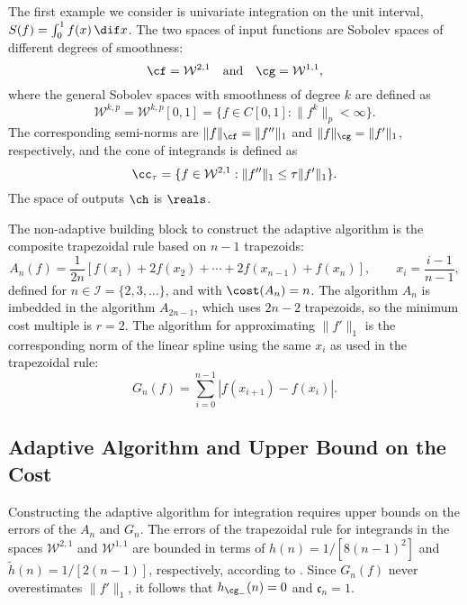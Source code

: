 The first example we consider is univariate integration on the unit interval, $S(f)=\int_{0}^{1}f(x) \, \dif x$.  The two spaces of input functions are Sobolev spaces of different degrees of smoothness:
\begin{equation*}
  \cf=\mathcal{W}^{2,1} \quad \text{and} \quad
  \cg=\mathcal{W}^{1,1},
\end{equation*}
where the general Sobolev spaces with smoothness of degree $k$ are defined as 
\begin{equation} \label{defSobolev}
  \mathcal{W}^{k,p}=\mathcal{W}^{k,p}[0,1]=\{f\in C[0,1]: \|f^{k}\|_{p}<\infty\}.
\end{equation}
The corresponding semi-norms are $\|f\|_{\cf}=\|f''\|_{1}$ and $\|f\|_{\cg}=\|f'\|_{1}$, respectively, and the cone of integrands is defined as  
\begin{equation}\label{coneinteg}
\cc_{\tau}=\{f\in \mathcal{W}^{2,1}:\|f''\|_1\leq\tau\|f'\|_1\}.
\end{equation}
The space of outputs $\ch$ is $\reals$.

The non-adaptive building block to construct the adaptive algorithm is the composite trapezoidal rule based on $n-1$ trapezoids:
\begin{equation*}
    A_{n}(f)
    =\frac{1}{2n}[f(x_1)+2f(x_2)+\cdots+2f(x_{n-1})+f(x_n)], \qquad x_i=\frac{i-1}{n-1},
\end{equation*}
defined for $n \in \mathcal{I}=\{2,3,\ldots\}$, and with $\cost(A_n)=n$.  The algorithm $A_n$ is imbedded in the algorithm $A_{2n-1}$, which uses $2n-2$ trapezoids, so the minimum cost multiple is $r=2$.  
The algorithm for approximating $\|f'\|_{1}$ is the corresponding norm of the linear spline using the same $x_i$ as used in the trapezoidal rule:
\begin{equation}\label{1direst}
    G_n(f)=\sum_{i=0}^{n-1}\left|f(x_{i+1})-f(x_{i})\right|.
\end{equation} 

\subsection{Adaptive Algorithm and Upper Bound on the Cost}

Constructing the adaptive algorithm for integration requires upper bounds on the errors of the $A_n$ and $G_n$.  The errors of the trapezoidal rule for integrands in the spaces $\mathcal{W}^{2,1}$ and $\mathcal{W}^{1,1}$ are bounded in terms of $h(n)=1/[8(n-1)^2]$ and $\tilde{h}(n)=1/[2(n-1)]$, respectively, according to \cite[(7.14) and (7.15)]{BraPet11a}.  Since $G_{n}(f)$ never overestimates $\|f'\|_{1}$, it follows that $h_{\cg_{-}}(n)=0$ and $\mathfrak{c}_n=1$. 

